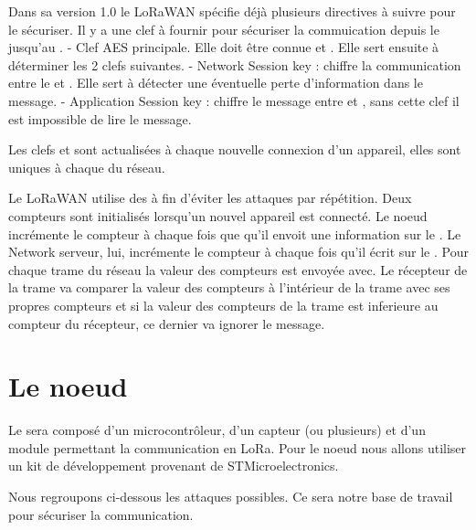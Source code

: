 \documentclass[letterpaper,10pt,french]{sphinxmanual}
\begin{document}
Dans sa version 1.0 le LoRaWAN spécifie déjà plusieurs directives à suivre pour le sécuriser.
Il y a une clef  à fournir pour sécuriser la commuication depuis le  jusqu’au .
-  Clef AES principale. Elle doit être connue  et . Elle sert ensuite à déterminer les 2 clefs suivantes.
-  Network Session key : chiffre la communication entre le  et . Elle sert à détecter une éventuelle perte d’information dans le message.
-  Application Session key : chiffre le message entre  et , sans cette clef il est impossible de lire le message.

Les clefs  et  sont actualisées à chaque nouvelle connexion d’un appareil, elles sont uniques à chaque  du réseau.

Le LoRaWAN utilise des  à fin d’éviter les attaques par répétition.
Deux compteurs sont initialisés lorsqu’un nouvel appareil est connecté.
Le noeud incrémente le compteur  à chaque fois que qu’il envoit une information sur le . Le Network serveur, lui, incrémente le compteur  à chaque fois qu’il écrit sur le . Pour chaque trame du réseau la valeur des compteurs est envoyée avec. Le récepteur de la trame va comparer la valeur des compteurs à l’intérieur de la trame avec ses propres compteurs et si la valeur des compteurs de la trame est inferieure au compteur du récepteur, ce dernier va ignorer le message.


\section{Le noeud}
\label{\detokenize{specifications:le-noeud}}
Le  sera composé d’un microcontrôleur, d’un capteur (ou plusieurs) et d’un module permettant la communication en LoRa. Pour le noeud nous allons utiliser un kit de développement provenant de STMicroelectronics.

Nous regroupons ci-dessous les attaques possibles. Ce sera notre base de travail pour sécuriser la communication.
\end{document}
